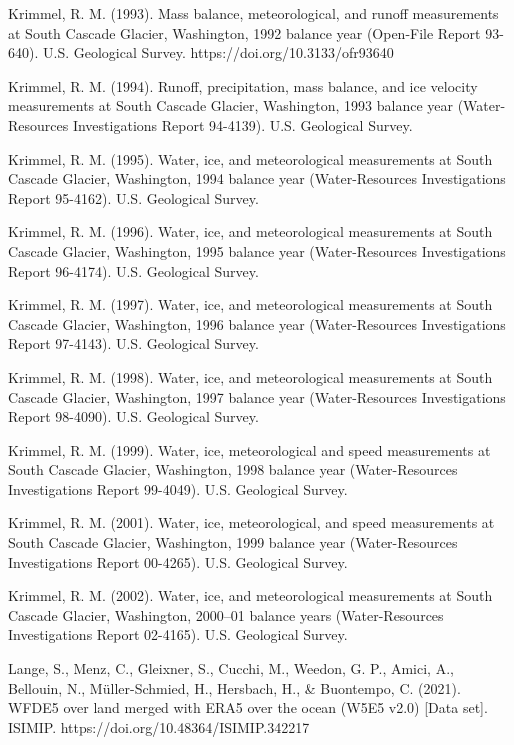 \documentclass{article}
\begin{document}
\begin{thebibliography}{}
    Krimmel, R. M. (1993). Mass balance, meteorological, and runoff measurements at South Cascade Glacier, Washington, 1992 balance year (Open-File Report 93-640). U.S. Geological Survey. https://doi.org/10.3133/ofr93640

    Krimmel, R. M. (1994). Runoff, precipitation, mass balance, and ice velocity measurements at South Cascade Glacier, Washington, 1993 balance year (Water-Resources Investigations Report 94-4139). U.S. Geological Survey.

    Krimmel, R. M. (1995). Water, ice, and meteorological measurements at South Cascade Glacier, Washington, 1994 balance year (Water-Resources Investigations Report 95-4162). U.S. Geological Survey.

    Krimmel, R. M. (1996). Water, ice, and meteorological measurements at South Cascade Glacier, Washington, 1995 balance year (Water-Resources Investigations Report 96-4174). U.S. Geological Survey.

    Krimmel, R. M. (1997). Water, ice, and meteorological measurements at South Cascade Glacier, Washington, 1996 balance year (Water-Resources Investigations Report 97-4143). U.S. Geological Survey.

    Krimmel, R. M. (1998). Water, ice, and meteorological measurements at South Cascade Glacier, Washington, 1997 balance year (Water-Resources Investigations Report 98-4090). U.S. Geological Survey.

    Krimmel, R. M. (1999). Water, ice, meteorological and speed measurements at South Cascade Glacier, Washington, 1998 balance year (Water-Resources Investigations Report 99-4049). U.S. Geological Survey.

    Krimmel, R. M. (2001). Water, ice, meteorological, and speed measurements at South Cascade Glacier, Washington, 1999 balance year (Water-Resources Investigations Report 00-4265). U.S. Geological Survey.

    Krimmel, R. M. (2002). Water, ice, and meteorological measurements at South Cascade Glacier, Washington, 2000–01 balance years (Water-Resources Investigations Report 02-4165). U.S. Geological Survey.

    Lange, S., Menz, C., Gleixner, S., Cucchi, M., Weedon, G. P., Amici, A., Bellouin, N., Müller-Schmied, H., Hersbach, H., \& Buontempo, C. (2021). WFDE5 over land merged with ERA5 over the ocean (W5E5 v2.0) [Data set]. ISIMIP. https://doi.org/10.48364/ISIMIP.342217


\end{thebibliography}
\end{document}
